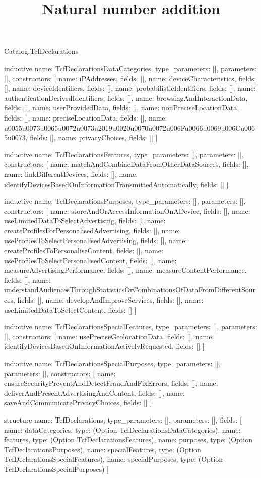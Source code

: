 \begin{lexlean}{Catalog.TcfDeclarations}
\title{Natural number addition}
\begin{semanticmodule}
inductive{
  name: TcfDeclarationsDataCategories,
  type_parameters: [],
  parameters: [],
  constructors: [
    {name: iPAddresses, fields: []},
    {name: deviceCharacteristics, fields: []},
    {name: deviceIdentifiers, fields: []},
    {name: probabilisticIdentifiers, fields: []},
    {name: authenticationDerivedIdentifiers, fields: []},
    {name: browsingAndInteractionData, fields: []},
    {name: userProvidedData, fields: []},
    {name: nonPreciseLocationData, fields: []},
    {name: preciseLocationData, fields: []},
    {name: u0055u0073u0065u0072u0073u2019u0020u0070u0072u006Fu0066u0069u006Cu0065u0073, fields: []},
    {name: privacyChoices, fields: []}
  ]
}

inductive{
  name: TcfDeclarationsFeatures,
  type_parameters: [],
  parameters: [],
  constructors: [
    {name: matchAndCombineDataFromOtherDataSources, fields: []},
    {name: linkDifferentDevices, fields: []},
    {name: identifyDevicesBasedOnInformationTransmittedAutomatically, fields: []}
  ]
}

inductive{
  name: TcfDeclarationsPurposes,
  type_parameters: [],
  parameters: [],
  constructors: [
    {name: storeAndOrAccessInformationOnADevice, fields: []},
    {name: useLimitedDataToSelectAdvertising, fields: []},
    {name: createProfilesForPersonalisedAdvertising, fields: []},
    {name: useProfilesToSelectPersonalisedAdvertising, fields: []},
    {name: createProfilesToPersonaliseContent, fields: []},
    {name: useProfilesToSelectPersonalisedContent, fields: []},
    {name: measureAdvertisingPerformance, fields: []},
    {name: measureContentPerformance, fields: []},
    {name: understandAudiencesThroughStatisticsOrCombinationsOfDataFromDifferentSources, fields: []},
    {name: developAndImproveServices, fields: []},
    {name: useLimitedDataToSelectContent, fields: []}
  ]
}

inductive{
  name: TcfDeclarationsSpecialFeatures,
  type_parameters: [],
  parameters: [],
  constructors: [
    {name: usePreciseGeolocationData, fields: []},
    {name: identifyDevicesBasedOnInformationActivelyRequested, fields: []}
  ]
}

inductive{
  name: TcfDeclarationsSpecialPurposes,
  type_parameters: [],
  parameters: [],
  constructors: [
    {name: ensureSecurityPreventAndDetectFraudAndFixErrors, fields: []},
    {name: deliverAndPresentAdvertisingAndContent, fields: []},
    {name: saveAndCommunicatePrivacyChoices, fields: []}
  ]
}

structure{
  name: TcfDeclarations,
  type_parameters: [],
  parameters: [],
  fields: [
    {name: dataCategories, type: (Option TcfDeclarationsDataCategories)},
    {name: features, type: (Option TcfDeclarationsFeatures)},
    {name: purposes, type: (Option TcfDeclarationsPurposes)},
    {name: specialFeatures, type: (Option TcfDeclarationsSpecialFeatures)},
    {name: specialPurposes, type: (Option TcfDeclarationsSpecialPurposes)}
  ]
}
\end{semanticmodule}
\end{lexlean}
